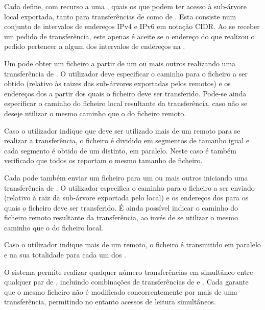 Cada  define, com recurso a uma , quais os  que podem ter acesso à sub-árvore local exportada, tanto para transferências de  como de . Esta  consiste num conjunto de intervalos de endereços IPv4 e IPv6 em notação CIDR. Ao se receber um pedido de transferência, este apenas é aceite se o endereço do  que realizou o pedido pertencer a algum dos intervalos de endereços na .


Um  pode obter um ficheiro a partir de um ou mais outros  realizando uma transferência de . O utilizador deve especificar o caminho para o ficheiro a ser obtido (relativo às raizes das sub-árvores exportadas pelos  remotos) e os endereços dos  a partir dos quais o ficheiro deve ser transferido. Pode-se ainda especificar o caminho do ficheiro local resultante da transferência, caso não se deseje utilizar o mesmo caminho que o do ficheiro remoto.

Caso o utilizador indique que deve ser utilizado mais de um  remoto para se realizar a transferência, o ficheiro é dividido em segmentos de tamanho igual e cada segmento é obtido de um  distinto, em paralelo. Neste caso é também verificado que todos os  reportam o mesmo tamanho de ficheiro.


Cada  pode também enviar um ficheiro para um ou mais outros  iniciando uma transferência de . O utilizador especifica o caminho para o ficheiro a ser enviado (relativo à raiz da sub-árvore exportada pelo  local) e os endereços dos  para os quais o ficheiro deve ser transferido. É ainda possível indicar o caminho do ficheiro remoto resultante da transferência, ao invés de se utilizar o mesmo caminho que o do ficheiro local.

Caso o utilizador indique mais de um  remoto, o ficheiro é transmitido em paralelo e na sua totalidade para cada um dos .


O sistema permite realizar qualquer número transferências em simultâneo entre qualquer par de , incluindo combinações de transferências de  e . Cada  garante que o mesmo ficheiro não é modificado concorrentemente por mais de uma transferência, permitindo no entanto acessos de leitura simultâneos.

